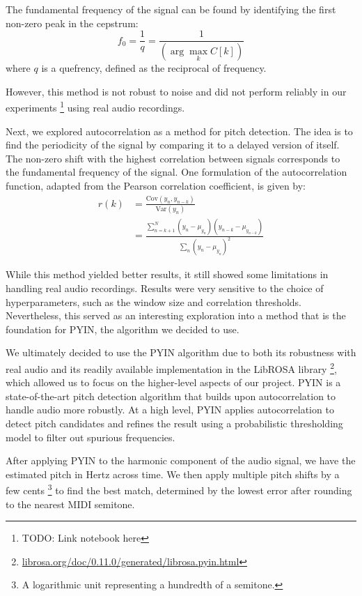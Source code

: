 The fundamental frequency of the signal can be found by identifying the first non-zero peak in the cepstrum:
$$f_0 = \frac{1}{q} = \frac{1}{\left(\arg\max_{k} C[k]\right)}$$
where $q$ is a quefrency, defined as the reciprocal of frequency.

However, this method is not robust to noise and did not perform reliably in our experiments \footnote{TODO: Link notebook here} using real audio recordings.


Next, we explored autocorrelation as a method for pitch detection. The idea is to find the periodicity of the signal by comparing it to a delayed version of itself. The non-zero shift with the highest correlation between signals corresponds to the fundamental frequency of the signal. One formulation of the autocorrelation function, adapted from the Pearson correlation coefficient, is given by:
\begin{align*}
    r(k)
    &= \frac{\text{Cov}(y_n, y_{n-k})}{\text{Var}(y_n)} \\
    &= \frac{\sum_{n=k+1}^N (y_n - \mu_{y_n}) (y_{n-k} - \mu_{y_{n-k}})}{\sum_n (y_n - \mu_{y_n})^2}
\end{align*}

While this method yielded better results, it still showed some limitations in handling real audio recordings. Results were very sensitive to the choice of hyperparameters, such as the window size and correlation thresholds. Nevertheless, this served as an interesting exploration into a method that is the foundation for PYIN, the algorithm we decided to use.


We ultimately decided to use the PYIN algorithm \autocite{PYIN:2014} due to both its robustness with real audio and its readily available implementation in the LibROSA library \footnote{\href{https://librosa.org/doc/0.11.0/generated/librosa.pyin.html}{librosa.org/doc/0.11.0/generated/librosa.pyin.html}}, which allowed us to focus on the higher-level aspects of our project. PYIN is a state-of-the-art pitch detection algorithm that builds upon autocorrelation to handle audio more robustly. At a high level, PYIN applies autocorrelation to detect pitch candidates and refines the result using a probabilistic thresholding model to filter out spurious frequencies.

After applying PYIN to the harmonic component of the audio signal, we have the estimated pitch in Hertz across time. We then apply multiple pitch shifts by a few cents \footnote{A logarithmic unit representing a hundredth of a semitone.} to find the best match, determined by the lowest error after rounding to the nearest MIDI semitone.

